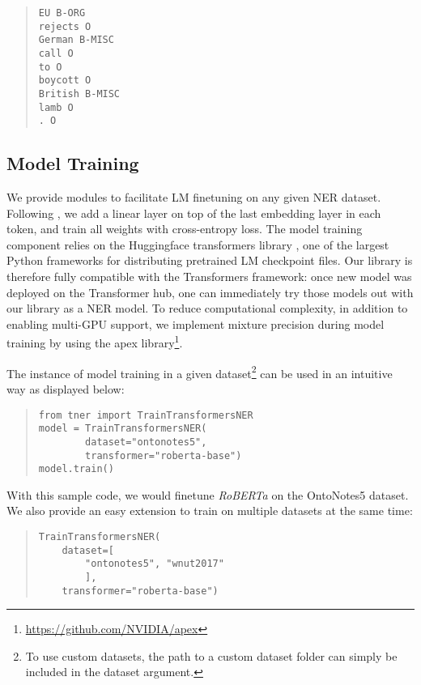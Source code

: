 \documentclass[11pt,a4paper]{article}
\begin{document}
\begin{quote}
\small
\begin{verbatim}
EU B-ORG
rejects O
German B-MISC
call O
to O
boycott O
British B-MISC
lamb O
. O
\end{verbatim}
\end{quote}

\subsection{Model Training}


We provide modules to facilitate LM finetuning on any given NER dataset. Following \citet{devlin2018bert}, we add a linear layer on top of the last embedding layer in each token, and train all weights with cross-entropy loss. The model training component relies on the Huggingface transformers library \citep{Wolf2019HuggingFacesTS}, one of the largest Python frameworks for distributing pretrained LM checkpoint files. Our library is therefore fully compatible with the Transformers framework: once new model was deployed on the Transformer hub, one can immediately try those models out with our library as a NER model.
To reduce computational complexity, in addition to enabling multi-GPU support, we implement mixture precision during model training by using the apex library\footnote{\url{https://github.com/NVIDIA/apex}}.

The instance of model training in a given dataset\footnote{To use custom datasets, the path to a custom dataset folder can simply be included in the dataset argument.} can be used in an intuitive way as displayed below: 
\begin{quote}
\small
\begin{verbatim}
from tner import TrainTransformersNER
model = TrainTransformersNER(
        dataset="ontonotes5",
        transformer="roberta-base")
model.train()
\end{verbatim}
\end{quote}
With this sample code, we would finetune {\it RoBERTa} \citep{liu2019roberta} on the OntoNotes5 dataset. We also provide an easy extension to train on multiple datasets at the same time:
\begin{quote}
\small
\begin{verbatim}
TrainTransformersNER(
    dataset=[
        "ontonotes5", "wnut2017"
        ],
    transformer="roberta-base")
\end{verbatim}
\end{quote}
\end{document}
